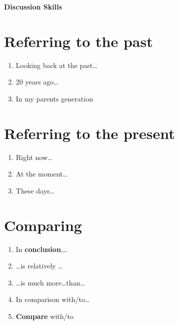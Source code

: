 \documentclass[11pt]{article}
\begin{document}
\begin{center}
    \vspace{0.6cm}
    {\Large \bf Discussion Skills}
    \vspace{0.3cm}
\end{center}

\section{Referring to the past}
\begin{enumerate}
    \item Looking back at the past\dots
    \item 20 years ago\dots
    \item In my parents generation
\end{enumerate}

\section{Referring to the present}
\begin{enumerate}
    \item Right now\dots
    \item At the moment\dots
    \item These days\dots
\end{enumerate}

\section{Comparing}
\begin{enumerate}
    \item In \textbf{conclusion},\dots
    \item \dots is relatively \dots
    \item \dots is much more\dots than\dots
    \item In comparison with/to\dots
    \item \textbf{Compare} with/to
\end{enumerate}
\end{document}
